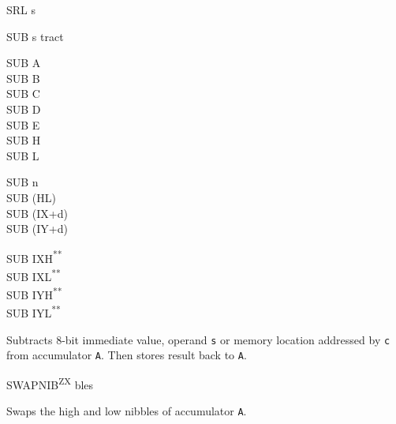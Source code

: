 \documentclass[12pt,twoside,openright,a4paper]{book}
\newcommand{\UNDOC}{\textnormal{\textsuperscript{**}}}
\newcommand{\ZXN}{\textnormal{\textsuperscript{ZX}}}
\begin{document}
\begin{basedescript}{
	\desclabelstyle{\multilinelabel}
	\desclabelwidth{3cm}}
\begin{DetailItem}{SRL s}
	\end{DetailItem}

	\pagebreak
	\begin{DetailItem}{SUB s}
		{tract}
		{}

		\begin{DetailVariants}
			SUB A\\
			SUB B\\
			SUB C\\
			SUB D\\
			SUB E\\
			SUB H\\
			SUB L

			\columnbreak
			SUB n\\
			SUB (HL)\\
			SUB (IX+d)\\
			SUB (IY+d)

			\columnbreak
			SUB IXH\UNDOC\\
			SUB IXL\UNDOC\\
			SUB IYH\UNDOC\\
			SUB IYL\UNDOC
		\end{DetailVariants}

		Subtracts 8-bit immediate value, operand {\tt s} or memory location addressed by {\tt c} from accumulator {\tt A}. Then stores result back to {\tt A}.

		\begin{DetailEffects}[v]
			\FlagsSUBr
		\end{DetailEffects}
						
		\begin{DetailTiming}
		\end{DetailTiming}

	\end{DetailItem}

	\begin{DetailItem}{SWAPNIB\ZXN}
		{ bles}
		{\SymSWAPNIB}

		Swaps the high and low nibbles of accumulator {\tt A}.

		\DetailNoEffect
						
		\begin{DetailTiming}
			\DetailTime{}{2}{8}
		\end{DetailTiming}

	\end{DetailItem}


\end{basedescript}
\end{document}
